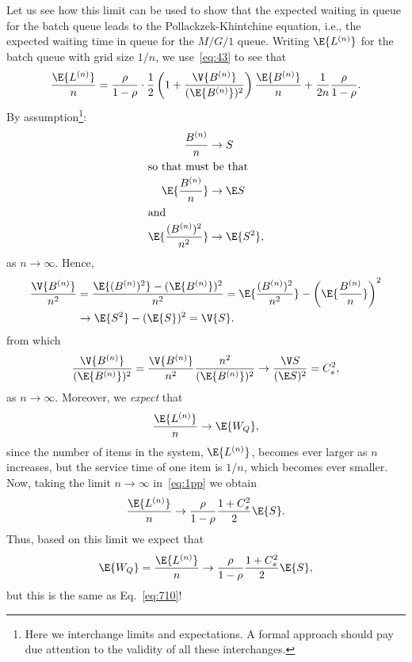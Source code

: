 Let us see how this limit can be used to show that the expected
waiting in queue for the batch queue leads to the
Pollackzek-Khintchine equation, i.e., the expected waiting time in
queue for the $M/G/1$ queue.  Writing $\E{L^{(n)}}$ for the batch
queue with grid size $1/n$, we use~\eqref{eq:43} to see that
\begin{align}\label{eq:1pp}
\frac{\E{L^{(n)}}}{n}
= \frac{\rho}{1-\rho}\cdot \frac12\left(1 + \frac{\V{B^{(n)}}}{(\E{B^{(n)}})^2}\right) \frac{\E{B^{(n)}}}n +  \frac1{2n}\frac{\rho}{1-\rho}.
\end{align}
By assumption\footnote{ Here we interchange limits and expectations. A
  formal approach should pay due attention to the validity of all
  these interchanges.}:
\begin{align*}
\frac{B^{(n)}}n &\to S \\
\intertext{so that must be that
}
\E{\frac{B^{(n)}}n} &\to \E S \\
\intertext{and}
\E{\frac{(B^{(n)})^2}{n^2}} &\to \E{S^2},
\end{align*}
as $n\to \infty$.  
Hence, 
\begin{equation*}
  \begin{split}
\frac{\V{B^{(n)}}}{n^2} 
&=  
\frac{\E{(B^{(n)})^2} - (\E{B^{(n)}})^2}{n^2} = 
\E{\frac{(B^{(n)})^2}{n^2}} - \left(\E{\frac{B^{(n)}}{n}}\right)^2 \\
&\to \E{S^2} - (\E{S})^2  =  \V{S}.
  \end{split}
\end{equation*}
from which
\begin{equation*}
\frac{\V{B^{(n)}}} {(\E{B^{(n)}})^2} = \frac{\V{B^{(n)}}}{n^2}\frac{n^2}{(\E{B^{(n)}})^2} \to 
\frac{\V S}{(\E S)^2} = C_s^2,
\end{equation*}
as $n\to \infty$.  Moreover, we \emph{expect} that
\begin{equation*}
\frac{\E{L^{(n)}}}n \to \E{W_Q},
\end{equation*}
since the number of items in the system, $\E{L^{(n)}}$, becomes ever
larger as $n$ increases, but the service time of one item is $1/n$,
which becomes ever smaller. Now, taking the limit $n\to\infty$
in~\eqref{eq:1pp} we obtain
\begin{equation*}
  \frac{\E{L^{(n)}}}{n}
  \to \frac{\rho}{1-\rho}  \frac{1 + C_s^2}2\E{S}.
\end{equation*}
Thus, based on this  limit we expect that 
\begin{equation*}
\E{W_Q}=  \frac{\E{L^{(n)}}}{n}
  \to \frac{\rho}{1-\rho}  \frac{1 + C_s^2}2\E{S},
\end{equation*}
but this is the same as Eq.~\eqref{eq:710}!

